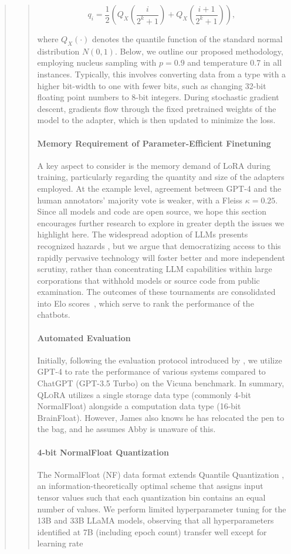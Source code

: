 \begin{quote}
\begin{abstract}
\begin{equation}
q_i  = \frac{1}{2}\left( Q_X\left(\frac{i}{2^k+1}\right) + Q_X\left(\frac{i+1}{2^k+1}\right)\right),
\end{equation}

where $Q_X(\cdot)$ denotes the quantile function of the standard normal distribution $N(0,1)$. Below, we outline our proposed methodology, employing nucleus sampling with $p=0.9$ and temperature $0.7$ in all instances. Typically, this involves converting data from a type with a higher bit-width to one with fewer bits, such as changing 32-bit floating point numbers to 8-bit integers. During stochastic gradient descent, gradients flow through the fixed pretrained weights of the model to the adapter, which is then updated to minimize the loss. \paragraph{Memory Requirement of Parameter-Efficient Finetuning} A key aspect to consider is the memory demand of LoRA during training, particularly regarding the quantity and size of the adapters employed. At the example level, agreement between GPT-4 and the human annotators’ majority vote is weaker, with a Fleiss $\kappa=0.25$. Since all models and code are open source, we hope this section encourages further research to explore in greater depth the issues we highlight here. The widespread adoption of LLMs presents recognized hazards \citep{bommasani2021opportunities,bender2021dangers}, but we argue that democratizing access to this rapidly pervasive technology will foster better and more independent scrutiny, rather than concentrating LLM capabilities within large corporations that withhold models or source code from public examination. The outcomes of these tournaments are consolidated into Elo scores~\citep{elo1967proposed, elo1978rating}, which serve to rank the performance of the chatbots. \paragraph{Automated Evaluation} Initially, following the evaluation protocol introduced by \citet{vicuna2023}, we utilize GPT-4 to rate the performance of various systems compared to ChatGPT (GPT-3.5 Turbo) on the Vicuna benchmark. In summary, \textsc{QLoRA} utilizes a single storage data type (commonly 4-bit NormalFloat) alongside a computation data type (16-bit BrainFloat). However, James also knows he has relocated the pen to the bag, and he assumes Abby is unaware of this. \paragraph{4-bit NormalFloat Quantization} The NormalFloat (NF) data format extends Quantile Quantization \citep{dettmers2022optimizers}, an information-theoretically optimal scheme that assigns input tensor values such that each quantization bin contains an equal number of values. We perform limited hyperparameter tuning for the 13B and 33B LLaMA models, observing that all hyperparameters identified at 7B (including epoch count) transfer well except for learning rate 
\end{abstract}
\end{quote}
